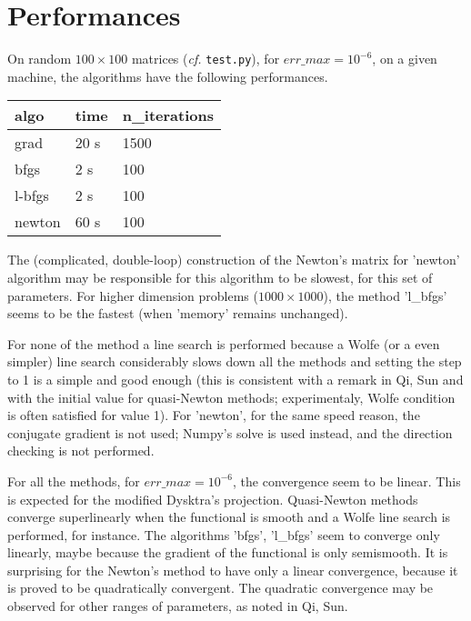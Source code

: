 \documentclass{article}
\begin{document}
\section{Performances}

On random $100 \times 100$ matrices (\emph{cf.} \texttt{test.py}), for $err\_max =10^{-6}$,  on a given machine, the algorithms have the following performances.

\medskip

\begin{center}
\begin{tabular}{lll}
 algo   & time  & n\_iterations \\ \hline
 grad   & 20 s  & 1500         \\
 bfgs   & 2 s   & 100          \\
 l-bfgs & 2 s   & 100          \\
 newton & 60 s  & 100          
\end{tabular}
\end{center}

\medskip

The (complicated, double-loop) construction of the Newton's matrix for 'newton' algorithm may be responsible for this algorithm to be slowest, for this set of parameters. For higher dimension problems ($1000 \times 1000$), the method 'l\_bfgs' seems to be the fastest (when 'memory' remains unchanged).

\medskip

For none of the method a line search is performed because a Wolfe (or a even simpler) line search considerably slows down all the methods and setting the step to 1 is a simple and good enough (this is consistent with a remark in Qi, Sun and with the initial value for quasi-Newton methods; experimentaly, Wolfe condition is often satisfied for value 1). For 'newton', for the same speed reason, the conjugate gradient is not used; Numpy's solve is used instead, and the direction checking is not performed.

\medskip

For all the methods, for $err\_max = 10^{-6}$, the convergence seem to be linear. This is expected for the modified Dysktra's projection. Quasi-Newton methods converge superlinearly when the functional is smooth and a Wolfe line search is performed, for instance. The algorithms 'bfgs', 'l\_bfgs' seem to converge only linearly, maybe because the gradient of the functional is only semismooth. It is surprising for the Newton's method to have only a linear convergence, because it is proved to be quadratically convergent. The quadratic convergence may be observed for other ranges of parameters, as noted in Qi, Sun.
\end{document}
